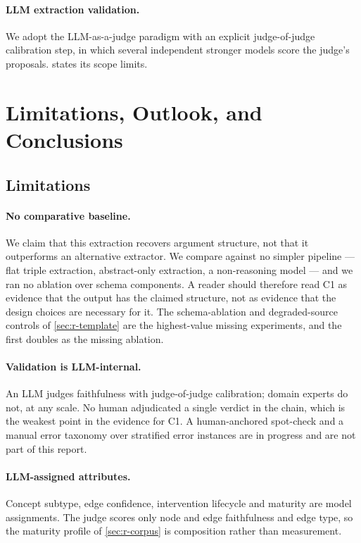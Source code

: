 \documentclass[10pt,twocolumn,letterpaper]{article}
\begin{document}
\paragraph{LLM extraction validation.} We adopt the LLM-as-a-judge paradigm
\citep{zheng2023judging} with an explicit judge-of-judge calibration step, in which
several independent stronger models score the judge's proposals.
 states its scope limits.

\section{Limitations, Outlook, and Conclusions}
\label{sec:lim-out-conc}

\subsection{Limitations}
\label{sec:limitations}

\paragraph{No comparative baseline.} We claim that this extraction recovers argument
structure, not that it outperforms an alternative extractor. We compare against no
simpler pipeline --- flat triple extraction, abstract-only extraction, a non-reasoning
model --- and we ran no ablation over schema components. A reader should therefore read
C1 as evidence that the output has the claimed structure, not as evidence that the design
choices are necessary for it. The schema-ablation and degraded-source controls of
\cref{sec:r-template} are the highest-value missing experiments, and the first doubles as
the missing ablation.

\paragraph{Validation is LLM-internal.} An LLM judges faithfulness with judge-of-judge
calibration; domain experts do not, at any scale. No human adjudicated a single verdict
in the chain, which is the weakest point in the evidence for C1. A human-anchored
spot-check and a manual error taxonomy over stratified error instances are in progress
and are not part of this report.

\paragraph{LLM-assigned attributes.} Concept subtype, edge confidence, intervention
lifecycle and maturity are model assignments. The judge scores only node and edge
faithfulness and edge type, so the maturity profile of \cref{sec:r-corpus} is composition
rather than measurement.
\end{document}
